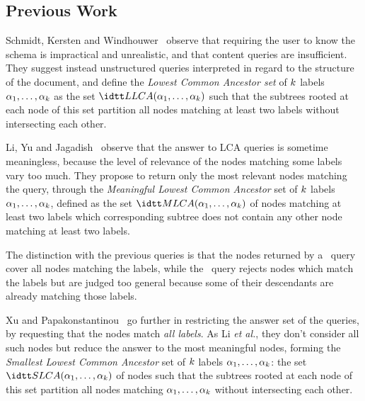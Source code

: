 \begin{LONG}
  \subsection{Previous Work}
  \label{sec:lca}

Schmidt, Kersten and Windhouwer~\cite{nearestConceptQueries} observe
that requiring the user to know the schema is impractical and
unrealistic, and that content queries are insufficient.
%
They suggest instead unstructured queries interpreted in regard to the
structure of the document, and define the {\em Lowest Common Ancestor
  set} of $k$ labels $\alpha_1,\ldots,\alpha_{k}$ as
the set $\LCASET(\lab_1,\ldots,\lab_\nbkeywords)$ such that the
subtrees rooted at each node of this set partition all nodes matching
at least two labels without intersecting each other.


\label{sec:mlca}

Li, Yu and Jagadish~\cite{schemaFreeXQuery} observe that the answer to
LCA queries is sometime meaningless, because the level of relevance of
the nodes matching some labels vary too much.
%
They propose to return only the most relevant nodes matching the
query, through the {\em Meaningful Lowest Common Ancestor} set of
$k$ labels $\alpha_1,\ldots,\alpha_{k}$, defined as
the set $\MLCASET(\lab_1,\ldots,\lab_\nbkeywords)$ of nodes matching
at least two labels which corresponding subtree does not contain any
other node matching at least two labels.

The distinction with the previous queries is that the nodes returned
by a \LCASET\ query cover all nodes matching the labels, while the
\MLCASET\ query rejects nodes which match the labels but are judged
too general because some of their descendants are already matching
those labels.


\label{sec:slca}

Xu and
Papakonstantinou~\cite{efficientKeywordSearchForSmallestLCAsInXMLDatabases}
go further in restricting the answer set of the queries, by requesting
that the nodes match {\em all labels}.
%
As Li {\em et al.}, they don't consider all such nodes but reduce the
answer to the most meaningful nodes, forming the {\em Smallest Lowest
  Common Ancestor} set of $k$ labels
$\alpha_1,\ldots,\alpha_{k}$: the set
$\SLCASET(\lab_1,\ldots,\lab_\nbkeywords)$ of nodes such that the
subtrees rooted at each node of this set partition all nodes matching
$\alpha_1,\ldots,\alpha_{k}$ without intersecting each other.


\end{LONG}
